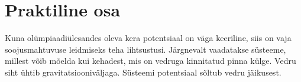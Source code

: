 \documentclass{trkut}%
\begin{document}

\chapter{Praktiline osa}

Kuna olümpiaadiülesandes oleva kera potentsiaal on väga keeriline, siis on vaja soojusmahtuvuse leidmiseks teha lihtsustusi.
Järgnevalt vaadatakse süsteeme, millest võib mõelda kui kehadest, mis on vedruga kinnitatud pinna külge.
Vedru siht ühtib gravitatsiooniväljaga.
Süsteemi potentsiaal sõltub vedru jäikusest.
\end{document}
